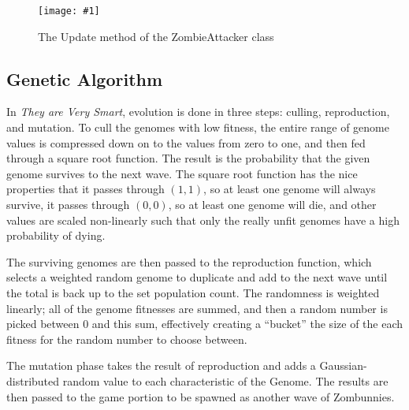 \documentclass[letterpaper]{article}
\def\imfig#1#2{\begin{figure}[h] \centering \texttt{[image: \#1]} \caption{#2} \end{figure}}
\def\tavs{\textit{They are Very Smart}}
\begin{document}
\imfig{ZombieAttacker}{The Update method of the ZombieAttacker class}



\subsection{Genetic Algorithm}

In \tavs, evolution is done in three steps: culling, reproduction, and mutation.
To cull the genomes with low fitness, the entire range of genome values is
compressed down on to the values from zero to one, and then fed through a square
root function. The result is the probability that the given genome survives to
the next wave. The square root function has the nice properties that it passes
through \((1,1)\), so at least one genome will always survive, it passes through
\((0,0)\), so at least one genome will die, and other values are scaled
non-linearly such that only the really unfit genomes have a high probability of
dying.

The surviving genomes are then passed to the reproduction function, which
selects a weighted random genome to duplicate and add to the next wave until
the total is back up to the set population count. The randomness is weighted
linearly; all of the genome fitnesses are summed, and then a random number is
picked between 0 and this sum, effectively creating a ``bucket'' the size of the
each fitness for the random number to choose between.

The mutation phase takes the result of reproduction and adds a
Gaussian-distributed random value to each characteristic of the Genome. The
results are then passed to the game portion to be spawned as another wave of
Zombunnies.
\end{document}

